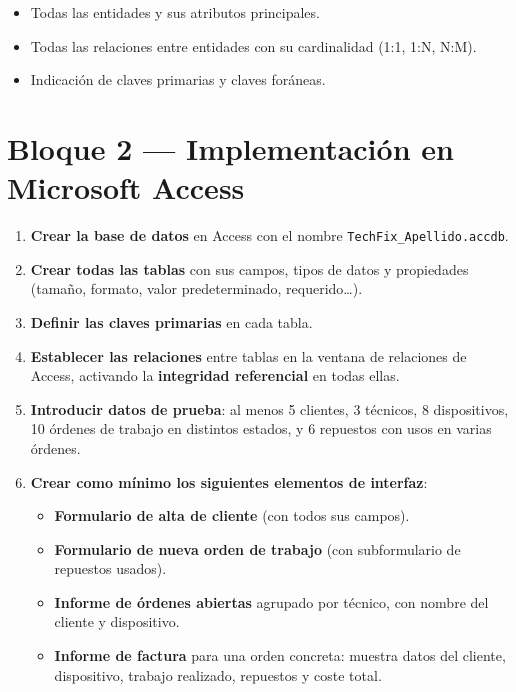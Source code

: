 \documentclass[12pt,a4paper]{article}
\begin{document}
\begin{itemize}
  \item Todas las entidades y sus atributos principales.
  \item Todas las relaciones entre entidades con su cardinalidad (1:1, 1:N, N:M).
  \item Indicación de claves primarias y claves foráneas.
\end{itemize}

\vspace{0.4cm}

\section{Bloque 2 — Implementación en Microsoft Access}

\begin{enumerate}[label=\bfseries\arabic{enumi}.]
  \item \textbf{Crear la base de datos} en Access con el nombre \texttt{TechFix\_Apellido.accdb}.
  \item \textbf{Crear todas las tablas} con sus campos, tipos de datos y propiedades
        (tamaño, formato, valor predeterminado, requerido\ldots).
  \item \textbf{Definir las claves primarias} en cada tabla.
  \item \textbf{Establecer las relaciones} entre tablas en la ventana de relaciones de Access,
        activando la \textbf{integridad referencial} en todas ellas.
  \item \textbf{Introducir datos de prueba}: al menos 5 clientes, 3 técnicos, 8 dispositivos,
        10 órdenes de trabajo en distintos estados, y 6 repuestos con usos en varias órdenes.
  \item \textbf{Crear como mínimo los siguientes elementos de interfaz}:
        \begin{itemize}
          \item \textbf{Formulario de alta de cliente} (con todos sus campos).
          \item \textbf{Formulario de nueva orden de trabajo} (con subformulario de repuestos usados).
          \item \textbf{Informe de órdenes abiertas} agrupado por técnico, con nombre del cliente
                y dispositivo.
          \item \textbf{Informe de factura} para una orden concreta: muestra datos del cliente,
                dispositivo, trabajo realizado, repuestos y coste total.
        \end{itemize}
\end{enumerate}
\end{document}
